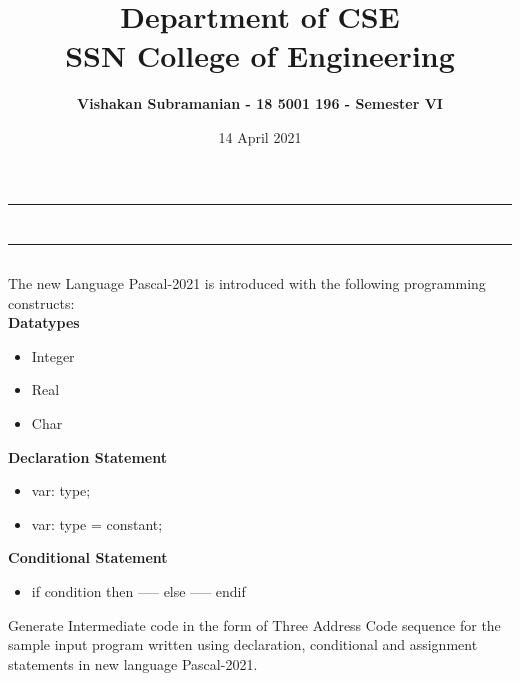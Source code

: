 \documentclass[12pt, a4]{article}
\title{\textbf{Department of CSE\\SSN College of Engineering}}
\author{\textbf{Vishakan Subramanian - 18 5001 196 - Semester VI}}
\date{14 April 2021}
\begin{document}
\maketitle
\hrule
\section*{}
\hrule
\bigskip

\subsection*{}
\subsection*{}
\begin{flushleft}
The new Language Pascal-2021 is introduced with the following programming constructs:\\
\textbf{Datatypes}
\begin{itemize}
\item Integer
\item Real
\item Char
\end{itemize}

\textbf{Declaration Statement}
\begin{itemize}
\item var: type;
\item var: type = constant;
\end{itemize}

\textbf{Conditional Statement}
\begin{itemize}
\item if condition then ----- else ----- endif
\end{itemize}

Generate Intermediate code in the form of Three Address Code sequence for the sample input program written using declaration, conditional and assignment statements in new language Pascal-2021.

\end{flushleft}

\newpage
\subsection*{}
\begin{flushleft}

\end{flushleft}
\end{document}
